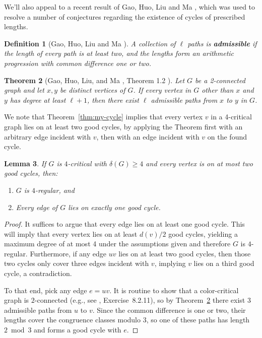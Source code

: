 \documentclass[12pt]{article}
\newtheorem{theorem}{Theorem}
\numberwithin{theorem}{section}
\newtheorem{lem}[theorem]{Lemma}
\newtheorem{definition}[theorem]{Definition}
\begin{document}
We'll also appeal to a recent result of Gao, Huo, Liu and Ma \cite{GHLM}, which was used to resolve a number of conjectures regarding the existence of cycles of prescribed lengths.

\begin{definition}[Gao, Huo, Liu and Ma \cite{GHLM}]
    A collection of $\ell$ paths is \textbf{admissible} if the length of every path is at least two, and the lengths form an arithmetic progression with common difference one or two.
\end{definition}

\begin{theorem} [Gao, Huo, Liu, and Ma \cite{GHLM}, Theorem 1.2 ]
\label{thm:admissible}
    Let $G$ be a 2-connected graph and let $x,y$ be distinct vertices of $G$. If every vertex in $G$ other than $x$ and $y$ has degree at least $\ell+1$, then there exist $\ell$ admissible paths from $x$ to $y$ in $G$.\\
\end{theorem}


We note that Theorem~\ref{thm:my-cycle} implies that every vertex $v$ in a 4-critical graph lies on at least two good cycles, by applying the Theorem first with an arbitrary edge incident with $v$, then with an edge incident with $v$ on the found cycle.




\begin{lem}
\label{lem:exactlyone}
    If $G$ is $4$-critical with $\delta(G) \ge 4$ and every vertex is on at most two good cycles, then:
    \begin{enumerate}
        \item $G$ is $4$-regular, and
        \item Every edge of $G$ lies on exactly one good cycle.
\end{enumerate}
\end{lem}

\begin{proof}
It suffices to argue that every edge lies on at least one good cycle.  This will imply that every vertex lies on at least $d(v)/2$ good cycles, yielding a maximum degree of at most 4 under the assumptions given and therefore $G$ is $4$-regular.  Furthermore, if any edge $uv$ lies on at least two good cycles, then those two cycles only cover three edges incident with $v$, implying $v$ lies on a third good cycle, a contradiction.

To that end, pick any edge $e=uv$. It is routine to show that a color-critical graph is $2$-connected (e.g., see \cite{WestCM}, Exercise~8.2.11), so by Theorem~\ref{thm:admissible} there exist $3$ admissible paths from $u$ to $v$. Since the common difference is one or two, their lengths cover the congruence classes modulo 3, so one of these paths has length $2\bmod 3$ and forms a good cycle with $e$.
\end{proof}
\end{document}
